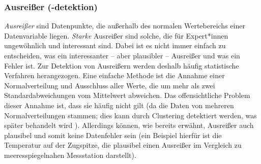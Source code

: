 			\subsubsection{Ausreißer (-detektion)}
				\emph{Ausreißer} sind Datenpunkte, die außerhalb des normalen Wertebereichs einer Datenvariable liegen. \emph{Starke} Ausreißer sind solche, die für Expert*innen ungewöhnlich und interessant sind. Dabei ist es nicht immer einfach zu entscheiden, was ein interessanter -- aber plausibler -- Ausreißer und was ein Fehler ist. Zur Detektion von Ausreißern werden deshalb häufig statistische Verfahren herangezogen. Eine einfache Methode ist die Annahme einer Normalverteilung und Ausschluss aller Werte, die um mehr als zwei Standardabweichungen vom Mittelwert abweichen. Das offensichtliche Problem dieser Annahme ist, dass sie häufig nicht gilt (\bspw da die Daten von mehreren Normalverteilungen stammen; dies kann durch Clustering detektiert werden, was später behandelt wird ). Allerdings können, wie bereits erwähnt, Ausreißer auch plausibel und somit keine Datenfehler sein (ein Beispiel hierfür ist die Temperatur auf der Zugspitze, die plausibel einen Ausreißer im Vergleich zu meeresspiegelnahen Messstation darstellt).

